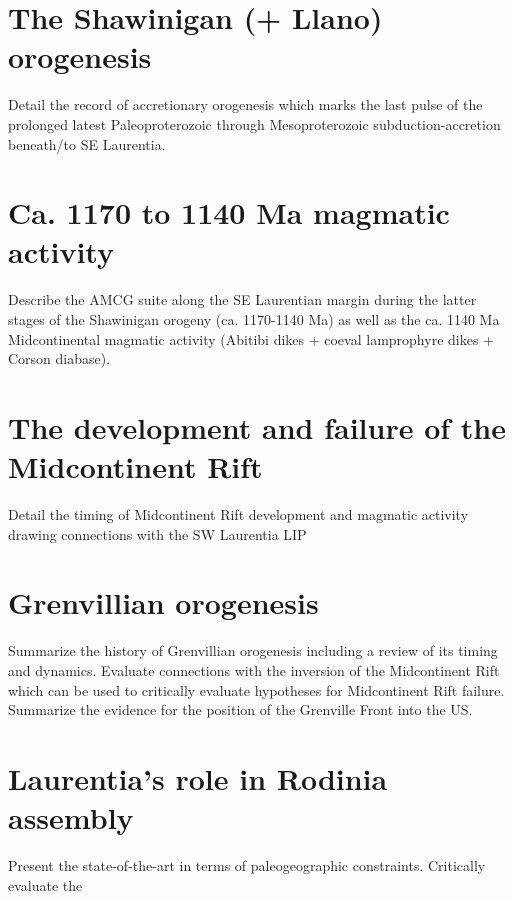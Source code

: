 \section{The Shawinigan (+ Llano) orogenesis}
Detail the record of accretionary orogenesis which marks the last pulse of the prolonged latest Paleoproterozoic through Mesoproterozoic subduction-accretion beneath/to SE Laurentia.

\section{Ca. 1170 to 1140 Ma magmatic activity}
Describe the AMCG suite along the SE Laurentian margin during the latter stages of the Shawinigan orogeny (ca. 1170-1140 Ma) as well as the ca. 1140 Ma Midcontinental magmatic activity (Abitibi dikes + coeval lamprophyre dikes + Corson diabase).

\section{The development and failure of the Midcontinent Rift}
Detail the timing of Midcontinent Rift development and magmatic activity drawing connections with the SW Laurentia LIP

\section{Grenvillian orogenesis}
Summarize the history of Grenvillian orogenesis including a review of its timing and dynamics. Evaluate connections with the inversion of the Midcontinent Rift which can be used to critically evaluate hypotheses for Midcontinent Rift failure. Summarize the evidence for the position of the Grenville Front into the US.

\section{Laurentia's role in Rodinia assembly}
Present the state-of-the-art in terms of paleogeographic constraints. Critically evaluate the 
